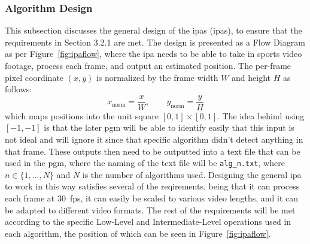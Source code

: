 \documentclass[12pt,a4paper]{article}
\begin{document}
\subsubsection{Algorithm Design}
This subsection discusses the general design of the \acs{ipa}s (\acl{ipa}s), to ensure that the requirements in Section 3.2.1 are met. The design is presented as a Flow Diagram as per Figure~\ref{fig:ipaflow}, where the \acs{ipa} needs to be able to take in sports video footage, process each frame, and output an estimated position. The per-frame pixel coordinate $(x,y)$ is normalized by the frame width $W$ and height $H$ as follows:
\begin{equation}
x_{\mathrm{norm}} = \frac{x}{W}, \qquad y_{\mathrm{norm}} = \frac{y}{H}
\end{equation}
which maps positions into the unit square $[0,1]\times[0,1]$. The idea behind using $[-1,-1]$ is that the later \acs{pgm} will be able to identify easily that this input is not ideal and will ignore it since that specific algorithm didn't detect anything in that frame. These outputs then need to be outputted into a text file that can be used in the \acs{pgm}, where the naming of the text file will be \texttt{alg\_n.txt}, where $n \in \{1,...,N\}$ and $N$ is the number of algorithms used. Designing the general \acs{ipa} to work in this way satisfies several of the reqirements, being that it can process each frame at 30~\acs{fps}, it can easily be scaled to various video lengths, and it can be adapted to different video formats. The rest of the requirements will be met according to the specific Low-Level and Intermediate-Level operations used in each algorithm, the position of which can be seen in Figure~\ref{fig:ipaflow}.
\end{document}
